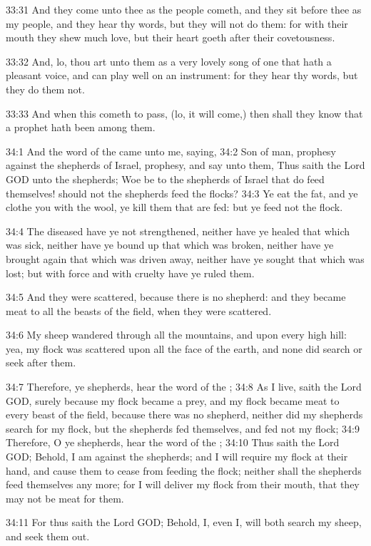 33:31 And they come unto thee as the people cometh, and they sit before thee as my people, and they hear thy words, but they will not do them: for with their mouth they shew much love, but their heart goeth after their covetousness.

33:32 And, lo, thou art unto them as a very lovely song of one that hath a pleasant voice, and can play well on an instrument: for they hear thy words, but they do them not.

33:33 And when this cometh to pass, (lo, it will come,) then shall they know that a prophet hath been among them.

34:1 And the word of the \LORD came unto me, saying, 34:2 Son of man, prophesy against the shepherds of Israel, prophesy, and say unto them, Thus saith the Lord GOD unto the shepherds; Woe be to the shepherds of Israel that do feed themselves! should not the shepherds feed the flocks?  34:3 Ye eat the fat, and ye clothe you with the wool, ye kill them that are fed: but ye feed not the flock.

34:4 The diseased have ye not strengthened, neither have ye healed that which was sick, neither have ye bound up that which was broken, neither have ye brought again that which was driven away, neither have ye sought that which was lost; but with force and with cruelty have ye ruled them.

34:5 And they were scattered, because there is no shepherd: and they became meat to all the beasts of the field, when they were scattered.

34:6 My sheep wandered through all the mountains, and upon every high hill: yea, my flock was scattered upon all the face of the earth, and none did search or seek after them.

34:7 Therefore, ye shepherds, hear the word of the \LORD; 34:8 As I live, saith the Lord GOD, surely because my flock became a prey, and my flock became meat to every beast of the field, because there was no shepherd, neither did my shepherds search for my flock, but the shepherds fed themselves, and fed not my flock; 34:9 Therefore, O ye shepherds, hear the word of the \LORD; 34:10 Thus saith the Lord GOD; Behold, I am against the shepherds; and I will require my flock at their hand, and cause them to cease from feeding the flock; neither shall the shepherds feed themselves any more; for I will deliver my flock from their mouth, that they may not be meat for them.

34:11 For thus saith the Lord GOD; Behold, I, even I, will both search my sheep, and seek them out.

